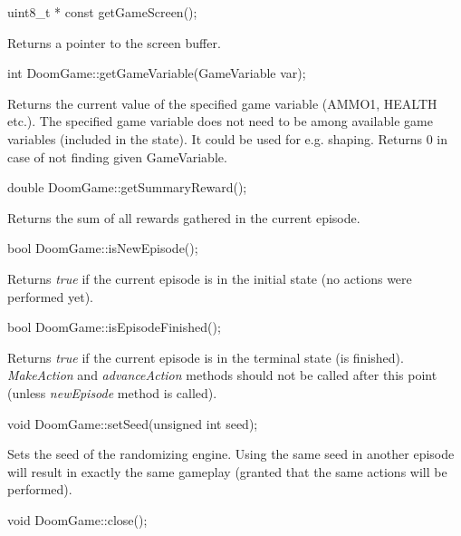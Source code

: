 \vspace{20pt}
\begin{clinee}
	uint8_t * const getGameScreen();
\end{clinee}

	Returns a pointer to the screen buffer.


\vspace{20pt}
\begin{clinee}
	int DoomGame::getGameVariable(GameVariable var);
\end{clinee}

	Returns the current value of the specified game variable (AMMO1, HEALTH etc.). The specified game variable does not need to be among available game variables (included in the state).
	It could be used for e.g. shaping. Returns 0 in case of not finding given GameVariable.


\vspace{20pt}
\begin{clinee}
	double DoomGame::getSummaryReward();
\end{clinee}

	Returns the sum of all rewards gathered in the current episode.


\vspace{20pt}
\begin{clinee}
	bool DoomGame::isNewEpisode();
\end{clinee}

	Returns \emph{true} if the current episode is in the initial state (no actions were performed yet).


\vspace{20pt}
\begin{clinee}
	bool DoomGame::isEpisodeFinished();
\end{clinee}

	Returns \emph{true} if the current episode is in the terminal state (is finished). \emph{MakeAction} and \emph{advanceAction} methods should not be called after this point (unless \emph{newEpisode} method is called).


\vspace{20pt}
\begin{clinee}
	void DoomGame::setSeed(unsigned int seed);
\end{clinee}

	Sets the seed of the randomizing engine. Using the same seed in another episode will result in exactly the same gameplay (granted that the same actions will be performed).


\vspace{20pt}
\begin{clinee}
	void DoomGame::close();
\end{clinee}

